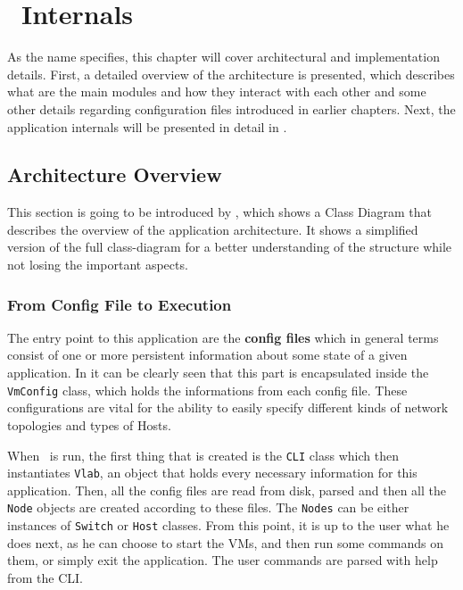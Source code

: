 \chapter{\project\ Internals}
\label{chapter:Chapter 4}

As the name specifies, this chapter will cover architectural and implementation details.
First, a detailed overview of the architecture is presented, which describes what are the main modules and how they interact with each other and some other details regarding configuration files introduced in earlier chapters.
Next, the application internals will be presented in detail in .

\section{Architecture Overview}
\label{sec:arh-overview}

This section is going to be introduced by , which shows a Class Diagram that describes the overview of the application architecture.
It shows a simplified version of the full class-diagram for a better understanding of the structure while not losing the important aspects.


\subsection{From Config File to Execution}
\label{sub-sec:arh-config-to-exec}

The entry point to this application are the \textbf{config files} which in general terms consist of one or more persistent information about some state of a given application.
In  it can be clearly seen that this part is encapsulated inside the \texttt{VmConfig} class, which holds the informations from each config file.
These configurations are vital for the ability to easily specify different kinds of network topologies and types of Hosts.

When \project\ is run, the first thing that is created is the \texttt{CLI} class which then instantiates \texttt{Vlab}, an object that holds every necessary information for this application.
Then, all the config files are read from disk, parsed and then all the \texttt{Node} objects  are created according to these files. The \texttt{Nodes} can be either instances of \texttt{Switch} or \texttt{Host} classes.
From this point, it is up to the user what he does next, as he can choose to start the VMs, and then run some commands on them, or simply exit the application.
The user commands are parsed with help from the CLI.

